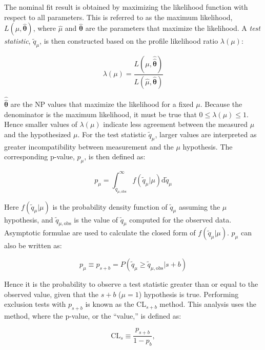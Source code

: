 The nominal fit result is obtained by maximizing the likelihood function with respect to all parameters. This is referred to as the maximum likelihood, $L(\hat{\mu}, \hat{\boldsymbol{\theta}})$, where $\hat\mu$ and $\hat{\boldsymbol{\theta}}$ are the parameters that maximize the likelihood. A \textit{test statistic}, $\tilde q_\mu$, is then constructed based on the profile likelihood ratio $\lambda(\mu)$:

\begin{equation}
\lambda(\mu) = \frac{L(\mu, \hat{\hat{\boldsymbol{\theta}}})}{L(\hat{\mu}, \hat{\boldsymbol{\theta}})}
\label{eqn:proflike}
\end{equation}

\noindent $\hat{\hat{\boldsymbol{\theta}}}$ are the NP values that maximize the likelihood for a fixed $\mu$. Because the denominator is the maximum likelihood, it must be true that $0 \leq \lambda(\mu) \leq 1$. Hence smaller values of $\lambda(\mu)$ indicate less agreement between the measured $\hat{\mu}$ and the hypothesized $\mu$. For the test statistic $\tilde q_\mu$, larger values are interpreted as greater incompatibility between measurement and the $\mu$ hypothesis. The corresponding p-value, $p_\mu$, is then defined as:

\begin{equation}
p_\mu = \int_{\tilde{q}_{\mu,\text{obs}}}^\infty f(\tilde{q}_\mu | \mu) \text{d}\tilde{q}_\mu
\label{eqn:pmu}
\end{equation}

\noindent Here $f(\tilde{q}_\mu | \mu)$ is the probability density function of $\tilde{q}_\mu$ assuming the $\mu$ hypothesis, and $\tilde{q}_{\mu,\text{obs}}$ is the value of $\tilde{q}_\mu$ computed for the observed data.
Asymptotic formulae \cite{Cowan:2010js} are used to calculate the closed form of $f(\tilde{q}_\mu | \mu)$. $p_\mu$ can also be written as:

\begin{equation}
p_\mu \equiv p_{s+b} = P(\tilde q_\mu \geq \tilde{q}_{\mu,\text{obs}} | s+b)
\end{equation}

\noindent Hence it is the probability to observe a test statistic greater than or equal to the observed value, given that the $s+b$ ($\mu=1$) hypothesis is true. Performing exclusion tests with $p_{s+b}$ is known as the CL$_{s+b}$ method. This analysis uses the \cls method, where the p-value, or the ``\cls value,'' is defined as:

\begin{equation}
\text{CL}_s \equiv \frac{p_{s+b}}{1-p_b},
\end{equation}

